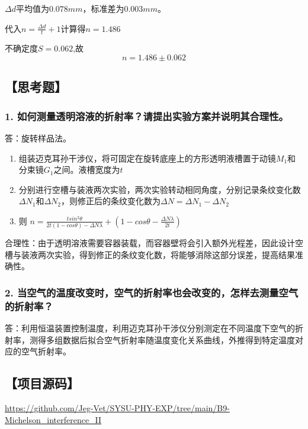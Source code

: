 \documentclass[12pt,a4paper,UTF8]{ctexart}
\begin{document}
		$\Delta d$平均值为$0.078mm$，标准差为$0.003mm$。
		
		代入$n = \frac{\Delta d}{t}+1$计算得$n = 1.486$

		不确定度$S = 0.062$,故
		$$
		n = 1.486 \pm 0.062
		$$

		

\subsection*{【思考题】}
	\subsubsection*{1. 如何测量透明溶液的折射率？请提出实验方案并说明其合理性。}
		答：旋转样品法。
		\begin{enumerate}[label=\arabic*.]
			\item 组装迈克耳孙干涉仪，将可固定在旋转底座上的方形透明液槽置于动镜$M_1$和分束镜$G_1$之间。液槽宽度为$t$		
			\item 分别进行空槽与装液两次实验，两次实验转动相同角度，分别记录条纹变化数$\Delta N_1$和$\Delta N_2$，则修正后的条纹变化数为$\Delta N=\Delta N_1-\Delta N_2$
			\item 则 $n = \frac{tsin^2\theta}{2t(1-cos\theta)-\Delta N \lambda}+ (1-cos\theta-\frac{\Delta N \lambda}{2t})$
		\end{enumerate}
		合理性：由于透明溶液需要容器装载，而容器壁将会引入额外光程差，因此设计空槽与装液两次实验，得到修正的条纹变化数，将能够消除这部分误差，提高结果准确性。
	\subsubsection*{2. 当空气的温度改变时，空气的折射率也会改变的，怎样去测量空气的折射率？}
		答：利用恒温装置控制温度，利用迈克耳孙干涉仪分别测定在不同温度下空气的折射率，测得多组数据后拟合空气折射率随温度变化关系曲线，外推得到特定温度对应的空气折射率。


\subsection*{【项目源码】}
\url{https://github.com/Jeg-Vet/SYSU-PHY-EXP/tree/main/B9-Michelson_interference_II}
		
\end{document}
